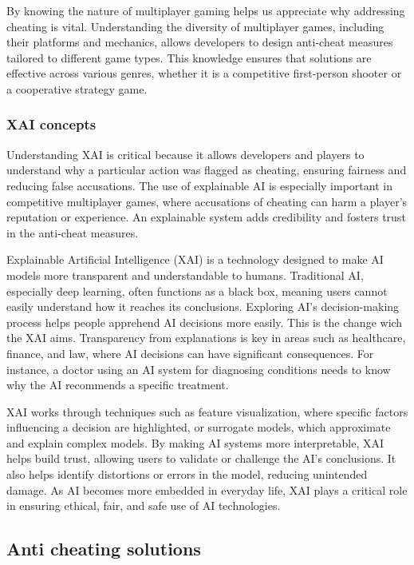 By knowing the nature of multiplayer gaming helps us appreciate why addressing cheating is vital. Understanding the diversity of multiplayer games, including their platforms and mechanics, allows developers to design anti-cheat measures tailored to different game types. This knowledge ensures that solutions are effective across various genres, whether it is a competitive first-person shooter or a cooperative strategy game.

\subsubsection{XAI concepts}

Understanding XAI is critical because it allows developers and players to understand why a particular action was flagged as cheating, ensuring fairness and reducing false accusations. The use of explainable AI is especially important in competitive multiplayer games, where accusations of cheating can harm a player's reputation or experience. An explainable system adds credibility and fosters trust in the anti-cheat measures. \cite{9231843}

Explainable Artificial Intelligence (XAI) is a technology designed to make AI models more transparent and understandable to humans. Traditional AI, especially deep learning, often functions as a black box, meaning users cannot easily understand how it reaches its conclusions. Exploring AI's decision-making process helps people apprehend AI decisions more easily. This is the change wich the XAI aims. Transparency from explanations is key in areas such as healthcare, finance, and law, where AI decisions can have significant consequences. For instance, a doctor using an AI system for diagnosing conditions needs to know why the AI recommends a specific treatment.

XAI works through techniques such as feature visualization, where specific factors influencing a decision are highlighted, or surrogate models, which approximate and explain complex models. By making AI systems more interpretable, XAI helps build trust, allowing users to validate or challenge the AI's conclusions. It also helps identify distortions or errors in the model, reducing unintended damage. As AI becomes more embedded in everyday life, XAI plays a critical role in ensuring ethical, fair, and safe use of AI technologies.

\subsection{Anti cheating solutions}

